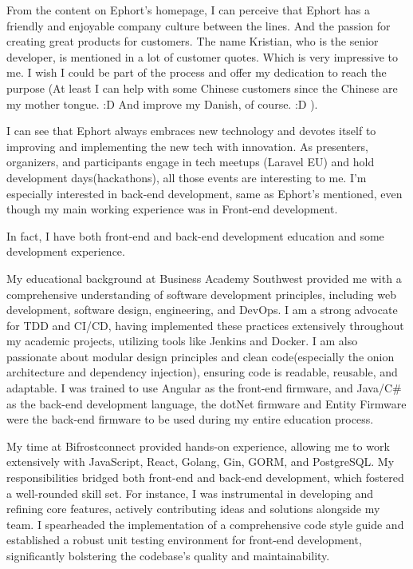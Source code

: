 \documentclass[a4paper]{article}
\begin{document}
\vspace{0.5em}
\hspace{1em}From the content on Ephort’s homepage, I can perceive that Ephort has a friendly and enjoyable company culture between the lines. And the passion for creating great products for customers. The name Kristian, who is the senior developer, is mentioned in a lot of customer quotes. Which is very impressive to me. I wish I could be part of the process and offer my dedication to reach the purpose (At least I can help with some Chinese customers since the Chinese are my mother tongue. :D And improve my Danish, of course. :D ).

\vspace{0.5em}
\hspace{1em}I can see that Ephort always embraces new technology and devotes itself to improving and implementing the new tech with innovation. As presenters, organizers, and participants engage in tech meetups (Laravel EU) and hold development days(hackathons), all those events are interesting to me. I’m especially interested in back-end development, same as Ephort’s mentioned, even though my main working experience was in Front-end development.

\vspace{0.5em}
\hspace{1em}In fact, I have both front-end and back-end development education and some development experience.

\vspace{0.5em}
\hspace{1em}My educational background at Business Academy Southwest provided me with a comprehensive understanding of software development principles, including web development, software design, engineering, and DevOps. I am a strong advocate for TDD and CI/CD, having implemented these practices extensively throughout my academic projects, utilizing tools like Jenkins and Docker. I am also passionate about modular design principles and clean code(especially the onion architecture and dependency injection), ensuring code is readable, reusable, and adaptable. I was trained to use Angular as the front-end firmware, and Java/C\# as the back-end development language, the dotNet firmware and Entity Firmware were the back-end firmware to be used during my entire education process.

\vspace{0.5em}
\hspace{1em}My time at Bifrostconnect provided hands-on experience, allowing me to work extensively with JavaScript, React, Golang, Gin, GORM, and PostgreSQL. My responsibilities bridged both front-end and back-end development, which fostered a well-rounded skill set. For instance, I was instrumental in developing and refining core features, actively contributing ideas and solutions alongside my team. I spearheaded the implementation of a comprehensive code style guide and established a robust unit testing environment for front-end development, significantly bolstering the codebase’s quality and maintainability.
\end{document}

